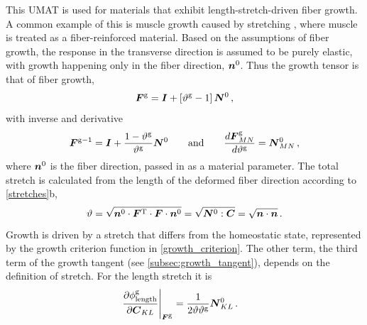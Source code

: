 \documentclass[10pt,letterpaper,oneside]{report}
\newcommand{\ten}[1]{\mbox{\boldmath $#1$}{}}
\newcommand{\tenf}[1]{\mbox{{\sffamily{\bfseries {#1}}}}}
\newcommand{\scas}[1]{\mbox{{\scriptsize{${\rm{#1}}$}}}{}}
\newcommand{\tens}[1]{\mbox{\boldmath{\scriptsize{$#1$}}}{}}
\begin{document}
This UMAT is used for materials that exhibit length-stretch-driven fiber growth.  A common example of this is muscle growth caused by stretching \autocite{Zollner2012}, where muscle is treated as a fiber-reinforced material.  Based on the assumptions of fiber growth, the response in the transverse direction is assumed to be purely elastic, with growth happening only in the fiber direction, $\ten{n}^0$.  Thus the growth tensor is that of fiber growth,
\begin{equation}
\ten{F}^{\scas{g}} = \ten{I} + \left[ \vartheta^{\scas{g}} - 1 \right] \ten{N}^0 \, , 
\label{Fg_fiber}
\end{equation}
with inverse and derivative
\begin{equation}
\ten{F}^{\scas{g}-1} = \ten{I} + \frac{1 - \vartheta^{\scas{g}}}{\vartheta^{\scas{g}}} \ten{N}^0 
\qquad \text{and} \qquad
\frac{d \ten{F}^{\scas{g}}_{MN} }{d \vartheta^{\scas{g}}} = \ten{N}^0_{MN} \, , 
\label{Fg_fiber2}
\end{equation}
where $\ten{n}^0$ is the fiber direction, passed in as a material parameter.  
The total stretch is calculated from the length of the deformed fiber direction according to \autoref{stretches}b, 
\begin{equation*}
\vartheta = \sqrt{ \ten{n}^0 \cdot \ten{F}^{\scas{T}} \cdot \ten{F} \cdot \ten{n}^0} = \sqrt{ \ten{N}^0 : \ten{C} } = \sqrt{ \ten{n} \cdot \ten{n}} \, . 
\label{fiber_stretch}
\end{equation*}
Growth is driven by a stretch that differs from the homeostatic state, represented by the growth criterion function in \autoref{growth_criterion}.
The other term, the third term of the growth tangent (see \autoref{subsec:growth_tangent}), depends on the definition of stretch.  For the length stretch it is
\begin{align}
\left. \frac{ \partial \phi^{\scas{g}}_{\scas{length}} }{ \partial \ten{C}_{KL} } \right|_{\tens{F}^{\scas{g}}}  
={}& \frac{1}{2 \vartheta \vartheta^{\scas{g}}} \ten{N}^0_{KL} \, .
\end{align}
\end{document}
